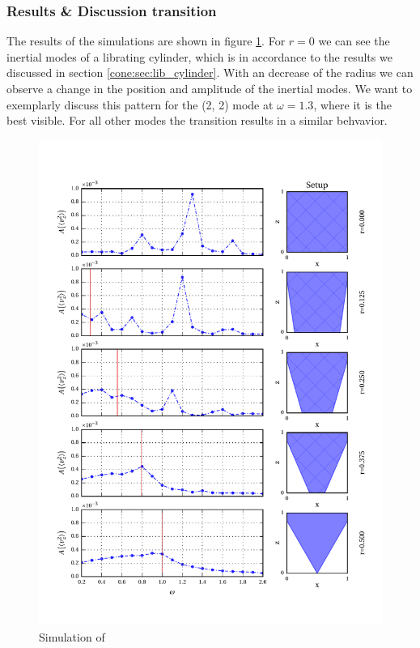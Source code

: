 \subsubsection{Results \& Discussion transition }

The results of the simulations are shown in figure \ref{fig:cone:transition}.
For $r=0$ we can see the inertial modes of a librating cylinder, which is in accordance
to the results we discussed in section \ref{cone:sec:lib_cylinder}.
With an decrease of the radius we can observe a change in the position and amplitude of the
inertial modes. We want to exemplarly discuss this pattern for the (2, 2) mode at $\omega=1.3$, where it is the best visible.
For all other modes the transition results in a similar behvavior.\\

\begin{figure}[!pt]
  \centering
  \includegraphics{gfx/cone/transition/transition.pdf}
  \caption{\label{fig:cone:transition}
    Simulation of
  }
\end{figure}

